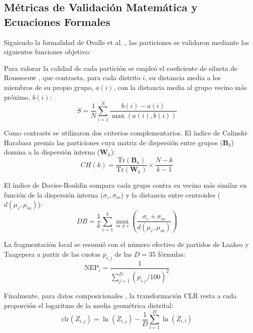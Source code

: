 \documentclass[conference,10pt,letterpaper]{IEEEtran}
\begin{document}
\subsection{Métricas de Validación Matemática y Ecuaciones Formales}

Siguiendo la formalidad de Ovalle et al. \cite{ovalle2024}, las particiones se validaron mediante las siguientes funciones objetivo:

Para valorar la calidad de cada partición se empleó el coeficiente de silueta de Rousseeuw \cite{rousseeuw1987}, que contrasta, para cada distrito $i$, su distancia media a los miembros de su propio grupo, $a(i)$, con la distancia media al grupo vecino más próximo, $b(i)$:
\begin{equation}
S = \frac{1}{N} \sum_{i=1}^{N} \frac{b(i) - a(i)}{\max(a(i), b(i))}
\label{eq:silhouette}
\end{equation}

Como contraste se utilizaron dos criterios complementarios. El índice de Calinski-Harabasz \cite{calinski1974} premia las particiones cuya matriz de dispersión entre grupos ($\mathbf{B}_k$) domina a la dispersión interna ($\mathbf{W}_k$):
\begin{equation}
CH(k) = \frac{\mathrm{Tr}(\mathbf{B}_k)}{\mathrm{Tr}(\mathbf{W}_k)} \times \frac{N - k}{k - 1}
\label{eq:ch}
\end{equation}

El índice de Davies-Bouldin \cite{davies1979} compara cada grupo contra su vecino más similar en función de la dispersión interna ($\sigma_c, \sigma_m$) y la distancia entre centroides ($d(\mu_c, \mu_m)$):
\begin{equation}
DB = \frac{1}{k} \sum_{c=1}^{k} \max_{m \neq c} \left( \frac{\sigma_c + \sigma_m}{d(\mu_c, \mu_m)} \right)
\label{eq:db}
\end{equation}

La fragmentación local se resumió con el número efectivo de partidos de Laakso y Taagepera a partir de las cuotas $p_{i,j}$ de las $D = 35$ fórmulas:
\begin{equation}
\mathrm{NEP}_i = \frac{1}{\sum_{j=1}^{D} (p_{i,j} / 100)^2}
\label{eq:nep}
\end{equation}

Finalmente, para datos composicionales \cite{greenacre2021}, la transformación CLR resta a cada proporción el logaritmo de la media geométrica distrital:
\begin{equation}
\mathrm{clr}(Z_{i,j}) = \ln(Z_{i,j}) - \frac{1}{D} \sum_{l=1}^{D} \ln(Z_{i,l})
\label{eq:clr}
\end{equation}
\end{document}
